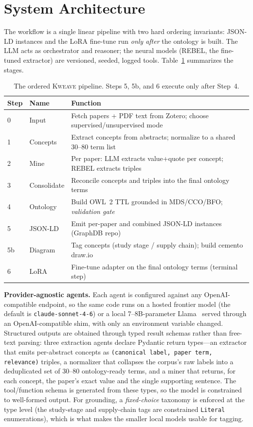 \documentclass[Afour,sageh,times]{sagej}
\begin{document}
\section{System Architecture}
The workflow is a single linear pipeline with two hard ordering invariants: JSON-LD instances and
the LoRA fine-tune run \emph{only after} the ontology is built. The LLM acts as orchestrator and
reasoner; the neural models (REBEL, the fine-tuned extractor) are versioned, seeded, logged tools.
Table~\ref{tab:stages} summarizes the stages.

\begin{table}[h]
\small\sf\centering
\caption{The ordered \textsc{Kweave} pipeline. Steps 5, 5b, and 6 execute only after Step~4.\label{tab:stages}}
\begin{tabular}{@{}llp{8.6cm}@{}}
\toprule
\textbf{Step} & \textbf{Name} & \textbf{Function} \\
\midrule
0 & Input        & Fetch papers + PDF text from Zotero; choose supervised/unsupervised mode \\
1 & Concepts     & Extract concepts from abstracts; normalize to a shared 30--80 term list \\
2 & Mine         & Per paper: LLM extracts value+quote per concept; REBEL extracts triples \\
3 & Consolidate  & Reconcile concepts and triples into the final ontology terms \\
4 & Ontology     & Build OWL~2 TTL grounded in MDS/CCO/BFO; \emph{validation gate} \\
5 & JSON-LD      & Emit per-paper and combined JSON-LD instances (GraphDB repo) \\
5b& Diagram      & Tag concepts (study stage / supply chain); build cemento draw.io \\
6 & LoRA         & Fine-tune adapter on the final ontology terms (terminal step) \\
\bottomrule
\end{tabular}
\end{table}

\noindent
\textbf{Provider-agnostic agents.} Each agent is configured against any OpenAI-compatible
endpoint, so the same code runs on a hosted frontier model (the default is \texttt{claude-sonnet-4-6})
or a local 7--8B-parameter Llama~\cite{touvron2023llama} served through an OpenAI-compatible shim,
with only an environment variable changed. Structured outputs are obtained through typed result
schemas rather than free-text parsing: three extraction agents declare Pydantic return types---an
extractor that emits per-abstract concepts as \texttt{(canonical label, paper term, relevance)}
triples, a normalizer that collapses the corpus's raw labels into a deduplicated set of 30--80
ontology-ready terms, and a miner that returns, for each concept, the paper's exact value and the
single supporting sentence. The tool/function schema is generated from these types, so the model is
constrained to well-formed output. For grounding, a \emph{fixed-choice} taxonomy is enforced at the
type level (the study-stage and supply-chain tags are constrained \texttt{Literal} enumerations),
which is what makes the smaller local models usable for tagging.
\end{document}
